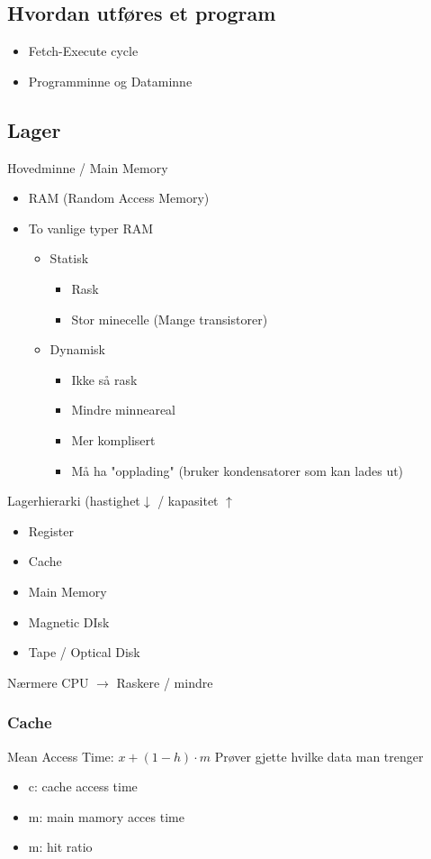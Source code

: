 \documentclass{article}
\begin{document}
		\subsection{Hvordan utføres et program}
			\begin{itemize}
				\item Fetch-Execute cycle
				\item Programminne og Dataminne
			\end{itemize}
		\subsection{Lager}
			Hovedminne / Main Memory
			\begin{itemize}
				\item RAM (Random Access Memory)
				\item To vanlige typer RAM
					\begin{itemize}
						\item Statisk
							\begin{itemize}
								\item Rask
								\item Stor minecelle (Mange transistorer)
							\end{itemize}
						\item Dynamisk
							\begin{itemize}
								\item Ikke så rask
								\item Mindre minneareal
								\item Mer komplisert
								\item Må ha "opplading" (bruker kondensatorer som kan lades ut)
							\end{itemize}
					\end{itemize}
			\end{itemize}
			Lagerhierarki (hastighet$\downarrow$ / kapasitet $\uparrow$ 
			
			\begin{itemize}
				\item Register
				\item Cache
				\item Main Memory
				\item Magnetic DIsk
				\item Tape / Optical Disk
			\end{itemize}
		Nærmere CPU $\rightarrow$ Raskere / mindre
			\subsubsection{Cache}
				Mean Access Time: $x + (1 - h) \cdot m$
				Prøver gjette hvilke data man trenger
				\begin{itemize}
					\item c: cache access time
					\item m: main mamory acces time
					\item m: hit ratio
				\end{itemize}
\end{document}
